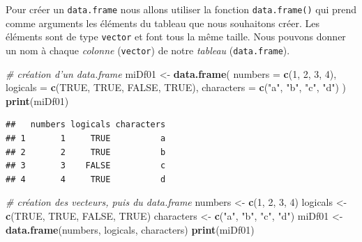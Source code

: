 \documentclass[]{book}
\newenvironment{Shaded}{\begin{snugshade}}{\end{snugshade}}
\newcommand{\CommentTok}[1]{\textcolor[rgb]{0.56,0.35,0.01}{\textit{#1}}}
\newcommand{\DataTypeTok}[1]{\textcolor[rgb]{0.13,0.29,0.53}{#1}}
\newcommand{\DecValTok}[1]{\textcolor[rgb]{0.00,0.00,0.81}{#1}}
\newcommand{\KeywordTok}[1]{\textcolor[rgb]{0.13,0.29,0.53}{\textbf{#1}}}
\newcommand{\NormalTok}[1]{#1}
\newcommand{\OtherTok}[1]{\textcolor[rgb]{0.56,0.35,0.01}{#1}}
\newcommand{\StringTok}[1]{\textcolor[rgb]{0.31,0.60,0.02}{#1}}
\begin{document}
Pour créer un \texttt{data.frame} nous allons utiliser la fonction \texttt{data.frame()} qui prend comme arguments les éléments du tableau que nous souhaitons créer. Les éléments sont de type \texttt{vector} et font tous la même taille. Nous pouvons donner un nom à chaque \emph{colonne} (\texttt{vector}) de notre \emph{tableau} (\texttt{data.frame}).

\begin{Shaded}
\begin{Highlighting}[]
\CommentTok{# création d'un data.frame }
\NormalTok{miDf01 <-}\StringTok{ }\KeywordTok{data.frame}\NormalTok{(}
  \DataTypeTok{numbers =} \KeywordTok{c}\NormalTok{(}\DecValTok{1}\NormalTok{, }\DecValTok{2}\NormalTok{, }\DecValTok{3}\NormalTok{, }\DecValTok{4}\NormalTok{), }
  \DataTypeTok{logicals =} \KeywordTok{c}\NormalTok{(}\OtherTok{TRUE}\NormalTok{, }\OtherTok{TRUE}\NormalTok{, }\OtherTok{FALSE}\NormalTok{, }\OtherTok{TRUE}\NormalTok{), }
  \DataTypeTok{characters =} \KeywordTok{c}\NormalTok{(}\StringTok{"a"}\NormalTok{, }\StringTok{"b"}\NormalTok{, }\StringTok{"c"}\NormalTok{, }\StringTok{"d"}\NormalTok{)}
\NormalTok{)}
\KeywordTok{print}\NormalTok{(miDf01)}
\end{Highlighting}
\end{Shaded}

\begin{verbatim}
##   numbers logicals characters
## 1       1     TRUE          a
## 2       2     TRUE          b
## 3       3    FALSE          c
## 4       4     TRUE          d
\end{verbatim}

\begin{Shaded}
\begin{Highlighting}[]
\CommentTok{# création des vecteurs, puis du data.frame}
\NormalTok{numbers <-}\StringTok{ }\KeywordTok{c}\NormalTok{(}\DecValTok{1}\NormalTok{, }\DecValTok{2}\NormalTok{, }\DecValTok{3}\NormalTok{, }\DecValTok{4}\NormalTok{)}
\NormalTok{logicals <-}\StringTok{ }\KeywordTok{c}\NormalTok{(}\OtherTok{TRUE}\NormalTok{, }\OtherTok{TRUE}\NormalTok{, }\OtherTok{FALSE}\NormalTok{, }\OtherTok{TRUE}\NormalTok{)}
\NormalTok{characters <-}\StringTok{ }\KeywordTok{c}\NormalTok{(}\StringTok{"a"}\NormalTok{, }\StringTok{"b"}\NormalTok{, }\StringTok{"c"}\NormalTok{, }\StringTok{"d"}\NormalTok{)}
\NormalTok{miDf01 <-}\StringTok{ }\KeywordTok{data.frame}\NormalTok{(numbers, logicals, characters)}
\KeywordTok{print}\NormalTok{(miDf01)}
\end{Highlighting}
\end{Shaded}
\end{document}
